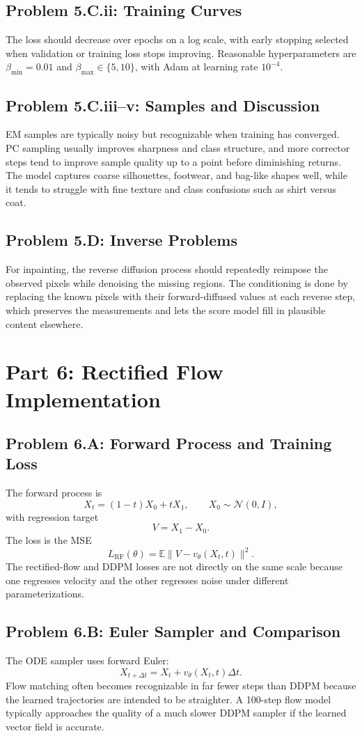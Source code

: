 \documentclass[11pt]{article}
\begin{document}
\subsection*{Problem 5.C.ii: Training Curves}
The loss should decrease over epochs on a log scale, with early stopping selected when validation or training loss stops improving. Reasonable hyperparameters are $\beta_{\min}=0.01$ and $\beta_{\max}\in\{5,10\}$, with Adam at learning rate $10^{-4}$.

\subsection*{Problem 5.C.iii--v: Samples and Discussion}
EM samples are typically noisy but recognizable when training has converged. PC sampling usually improves sharpness and class structure, and more corrector steps tend to improve sample quality up to a point before diminishing returns. The model captures coarse silhouettes, footwear, and bag-like shapes well, while it tends to struggle with fine texture and class confusions such as shirt versus coat.

\subsection*{Problem 5.D: Inverse Problems}
For inpainting, the reverse diffusion process should repeatedly reimpose the observed pixels while denoising the missing regions. The conditioning is done by replacing the known pixels with their forward-diffused values at each reverse step, which preserves the measurements and lets the score model fill in plausible content elsewhere.

\section{Part 6: Rectified Flow Implementation}
\subsection*{Problem 6.A: Forward Process and Training Loss}
The forward process is
\[
X_t=(1-t)X_0+tX_1,\qquad X_0\sim \mathcal N(0,I),
\]
with regression target
\[
V=X_1-X_0.
\]
The loss is the MSE
\[
L_{\mathrm{RF}}(\theta)=\mathbb E\|V-v_\theta(X_t,t)\|^2.
\]
The rectified-flow and DDPM losses are not directly on the same scale because one regresses velocity and the other regresses noise under different parameterizations.

\subsection*{Problem 6.B: Euler Sampler and Comparison}
The ODE sampler uses forward Euler:
\[
X_{t+\Delta t}=X_t+v_\theta(X_t,t)\Delta t.
\]
Flow matching often becomes recognizable in far fewer steps than DDPM because the learned trajectories are intended to be straighter. A 100-step flow model typically approaches the quality of a much slower DDPM sampler if the learned vector field is accurate.
\end{document}
